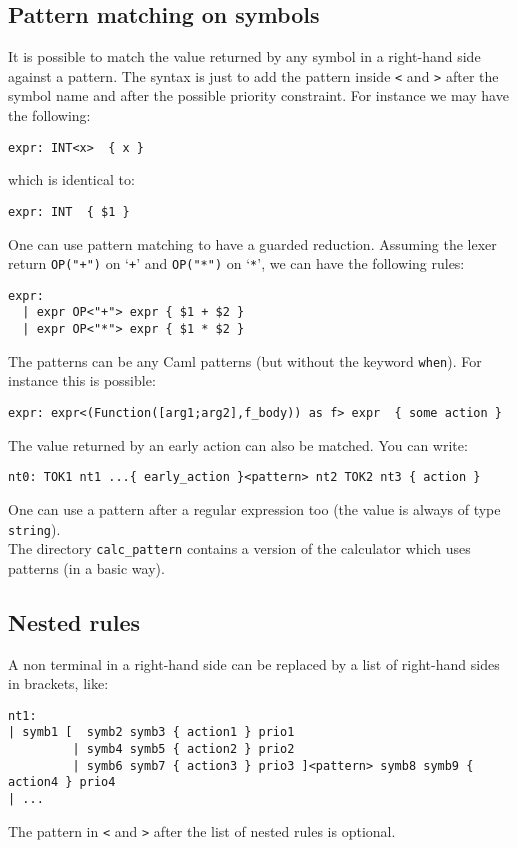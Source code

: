 \documentclass[12pt]{article}
\begin{document}
{\subsection{Pattern matching on symbols}\label{pattern}

It is possible to match the value returned by any symbol in a right-hand side against a pattern. The syntax is just to add the pattern inside \verb|<| and \verb|>| after the symbol name and after the possible priority constraint. For instance we may have the following:
\begin{verbatim}
expr: INT<x>  { x }
\end{verbatim}
which is identical to:
\begin{verbatim}
expr: INT  { $1 }
\end{verbatim}
One can use pattern matching to have a guarded reduction. Assuming the lexer return \texttt{OP("+")} on `\texttt{+}' and \texttt{OP("*")} on `\texttt{*}', we can have the following rules:
\begin{verbatim}
expr:
  | expr OP<"+"> expr { $1 + $2 }
  | expr OP<"*"> expr { $1 * $2 }
\end{verbatim}

The patterns can be any Caml patterns (but without the keyword \verb|when|). For instance this is possible:
\begin{verbatim}
expr: expr<(Function([arg1;arg2],f_body)) as f> expr  { some action }
\end{verbatim}

The value returned by an early action can also be matched. You can write:
\begin{verbatim}
nt0: TOK1 nt1 ...{ early_action }<pattern> nt2 TOK2 nt3 { action }
\end{verbatim}

One can use a pattern after a regular expression too (the value is always of type \verb|string|).\\

The directory \verb|calc_pattern| contains a version of the calculator which uses patterns (in a basic way).

\subsection{Nested rules}\label{nested}

A non terminal in a right-hand side can be replaced by a list of right-hand sides in brackets, like:
\begin{verbatim}
nt1:
| symb1 [  symb2 symb3 { action1 } prio1
         | symb4 symb5 { action2 } prio2
         | symb6 symb7 { action3 } prio3 ]<pattern> symb8 symb9 { action4 } prio4
| ...
\end{verbatim}
The pattern in \verb|<| and \verb|>| after the list of nested rules is optional.\\

}
\end{document}
